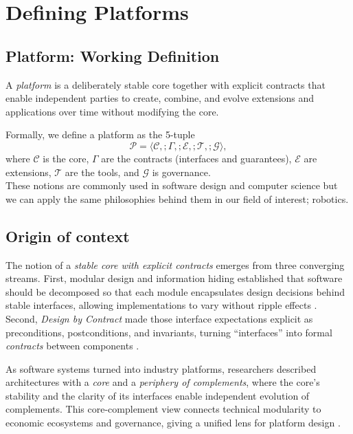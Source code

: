 \chapter{Defining Platforms}\label{chap\:defining-platforms}
\section{Platform: Working Definition}\label{sec\:platform-definition}
A \emph{platform} is a deliberately stable core together with explicit contracts that enable independent parties to create, combine, and evolve extensions and applications over time without modifying the core.

Formally, we define a platform as the 5-tuple
\begin{equation}
\mathcal{P} = \langle \mathcal{C},; \Gamma,; \mathcal{E},; \mathcal{T},; \mathcal{G} \rangle,
\end{equation}
where $\mathcal{C}$ is the core, $\Gamma$ are the contracts (interfaces and guarantees), $\mathcal{E}$ are extensions, $\mathcal{T}$ are the tools, and $\mathcal{G}$ is governance.\\

These notions are commonly used in software design and computer science but we can apply the same philosophies behind them in our field of interest; robotics. 

\section{Origin of context}

The notion of a \emph{stable core with explicit contracts} emerges from three converging streams. First, modular design and information hiding established that software should be decomposed so that each module encapsulates design decisions behind stable interfaces, allowing implementations to vary without ripple effects \cite{parnas1972}. Second, \emph{Design by Contract} made those interface expectations explicit as preconditions, postconditions, and invariants, turning “interfaces” into formal \emph{contracts} between components \cite{meyer1992}. 

As software systems turned into industry platforms, researchers described architectures with a \emph{core} and a \emph{periphery of complements}, where the core’s stability and the clarity of its interfaces enable independent evolution of complements. This core-complement view connects technical modularity to economic ecosystems and governance, giving a unified lens for platform design \cite{baldwin2009platforms}. 

